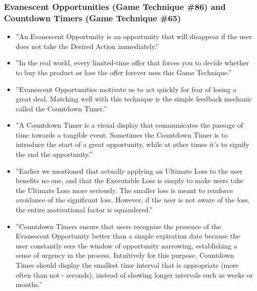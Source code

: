     \subsubsection{Evanescent Opportunities (Game Technique \#86) and Countdown Timers (Game Technique \#65)}
        \begin{itemize}
            \item ''An Evanescent Opportunity is an opportunity that will disappear if the user does not take the Desired Action immediately.''
            \item ''In the real world, every limited-time offer that forces you to decide whether to buy the product or lose the offer forever uses this Game Technique.''
            \item ''Evanescent Opportunities motivate us to act quickly for fear of losing a great deal. Matching well with this technique is the simple feedback mechanic called the Countdown Timer.''
            \item ''A Countdown Timer is a visual display that communicates the passage of time towards a tangible event. Sometimes the Countdown Timer is to introduce the start of a great opportunity, while at other times it's to signify the end the opportunity.''
            \item ''Earlier we mentioned that actually applying an Ultimate Loss to the user benefits no one, and that the Executable Loss is simply to make users take the Ultimate Loss more seriously. The smaller loss is meant to reinforce avoidance of the significant loss. However, if the user is not aware of the loss, the entire motivational factor is squandered.''
            \item ''Countdown Timers ensure that users recognize the presence of the Evanescent Opportunity better than a simple expiration date because the user constantly sees the window of opportunity narrowing, establishing a sense of urgency in the process. Intuitively for this purpose, Countdown Times should display the smallest time interval that is appropriate (more often than not - seconds), instead of showing longer intervals such as weeks or months.''
        \end{itemize}
        
